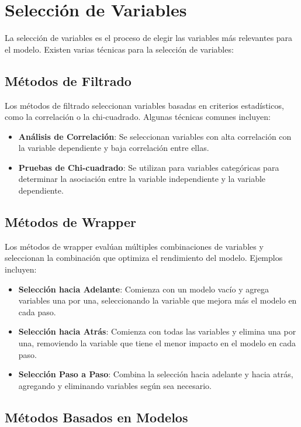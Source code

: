 \documentclass[a4paper]{report} %
\begin{document}
\section{Selecci\'on de Variables}

La selecci\'on de variables es el proceso de elegir las variables m\'as relevantes para el modelo. Existen varias t\'ecnicas para la selecci\'on de variables:

\subsection{M\'etodos de Filtrado}

Los m\'etodos de filtrado seleccionan variables basadas en criterios estad\'isticos, como la correlaci\'on o la chi-cuadrado. Algunas t\'ecnicas comunes incluyen:
\begin{itemize}
    \item \textbf{An\'alisis de Correlaci\'on}: Se seleccionan variables con alta correlaci\'on con la variable dependiente y baja correlaci\'on entre ellas.
    \item \textbf{Pruebas de Chi-cuadrado}: Se utilizan para variables categ\'oricas para determinar la asociaci\'on entre la variable independiente y la variable dependiente.
\end{itemize}

\subsection{M\'etodos de Wrapper}

Los m\'etodos de wrapper eval\'uan m\'ultiples combinaciones de variables y seleccionan la combinaci\'on que optimiza el rendimiento del modelo. Ejemplos incluyen:
\begin{itemize}
    \item \textbf{Selecci\'on hacia Adelante}: Comienza con un modelo vac\'io y agrega variables una por una, seleccionando la variable que mejora m\'as el modelo en cada paso.
    \item \textbf{Selecci\'on hacia Atr\'as}: Comienza con todas las variables y elimina una por una, removiendo la variable que tiene el menor impacto en el modelo en cada paso.
    \item \textbf{Selecci\'on Paso a Paso}: Combina la selecci\'on hacia adelante y hacia atr\'as, agregando y eliminando variables seg\'un sea necesario.
\end{itemize}

\subsection{M\'etodos Basados en Modelos}
\end{document}
